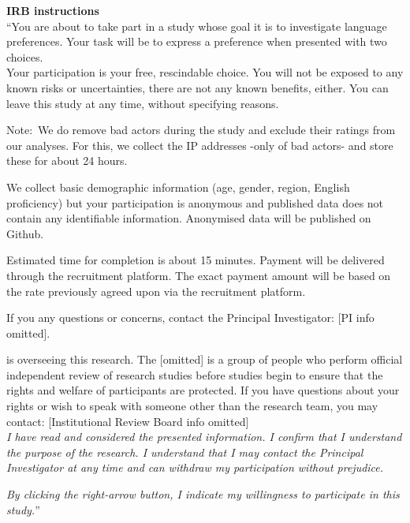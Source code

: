 \textbf{IRB instructions} \\

``You are about to take part in a study whose goal it is to investigate language preferences. Your task will be to express a preference when presented with two choices. \\

\noindent Your participation is your free, rescindable choice. You will not be exposed to any known risks or uncertainties, there are not any known benefits, either. You can leave this study at any time, without specifying reasons.

\noindent Note:\ We do remove bad actors during the study and exclude their ratings from our analyses. For this, we collect the IP addresses -only of bad actors- and store these for about 24 hours.

\noindent We collect basic demographic information (age, gender, region, English proficiency) but your participation is anonymous and published data does not contain any identifiable information. Anonymised data will be published on Github. 

\noindent Estimated time for completion is about 15 minutes. Payment will be delivered through the recruitment platform. The exact payment amount will be based on the rate previously agreed upon via the recruitment platform.

\noindent If you any questions or concerns, contact the Principal Investigator: [PI info omitted].

 is overseeing this research. The [omitted] is a group of people who perform official independent review of research studies before studies begin to ensure that the rights and welfare of participants are protected. If you have questions about your rights or wish to speak with someone other than the research team, you may contact: [Institutional Review Board info omitted] \\

\noindent \textit{I have read and considered the presented information. I confirm that I understand the purpose of the research. I understand that I may contact the Principal Investigator at any time and can withdraw my participation without prejudice.}

\noindent \textit{By clicking the right-arrow button, I indicate my willingness to participate in this study.}''\\

